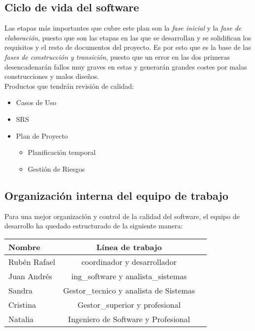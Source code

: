 \documentclass[11pt, a4paper, twoside, titlepage]{article}
\begin{document}
		\subsection{Ciclo de vida del software} %
			Las etapas más importantes que cubre este plan son la \textit{fase inicial} y la \textit{fase de elaboración}, puesto que son las etapas en las que se desarrollan y se solidifican los requisitos y el resto de documentos del proyecto. Es por esto que es la base de las \textit{fases de construcción y transición}, puesto que un error en las dos primeras desencadenarán fallos muy graves en estas y generarán grandes costes por malas construcciones y malos diseños.
 \\

			Productos que tendrán revisión de calidad: \\

				\begin{itemize}
					\item Casos de Uso
					\item SRS
					\item Plan de Proyecto
						\begin{itemize}
							\item Planificación temporal
							\item Gestión de Riesgos
						\end{itemize}
				\end{itemize}
				
		\subsection{Organización interna del equipo de trabajo}
			Para una mejor organización y control de la calidad del software, el equipo de desarrollo ha quedado estructurado de la siguiente manera:
			
			\begin{center}
				\begin{tabular}{| l | c | r |}
				\hline
				\bfseries Nombre 	& \bfseries Línea de trabajo			\\ \hline
				Rubén Rafael 		& \gls{coordinador} y \gls{desarrollador} 	\\ \hline
				Juan Andrés 		& \gls{ing_software} y \gls{analista_sistemas}	\\ \hline
				Sandra 			& \gls{Gestor_tecnico} y analista de Sistemas	\\ \hline
				Cristina 		& \gls{Gestor_superior} y \gls{profesional}	\\ \hline
				Natalia 		& Ingeniero de Software y Profesional		\\ \hline
				\end{tabular}
			\end{center}
			
\end{document}
